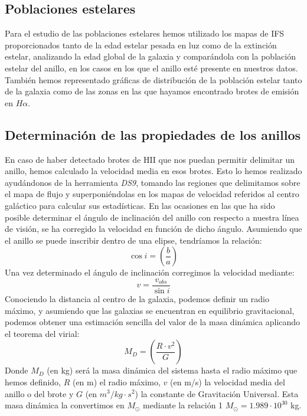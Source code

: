 \documentclass{article}
\newcommand{\hal}{$H\alpha$}
\begin{document}
\subsection{Poblaciones estelares}
Para el estudio de las poblaciones estelares hemos utilizado los mapas de IFS proporcionados tanto de la edad estelar pesada en luz como de la extinción estelar, analizando la edad global de la galaxia y comparándola con la población estelar del anillo, en los casos en los que el anillo esté presente en nuestros datos. También hemos representado gráficas de distribución de la población estelar tanto de la galaxia como de las zonas en las que hayamos encontrado brotes de emisión en \hal. 
\subsection{Determinación de las propiedades de los anillos}
En caso de haber detectado brotes de HII que nos puedan permitir delimitar un anillo, hemos calculado la velocidad media en esos brotes. Esto lo hemos realizado ayudándonos de la herramienta \emph{DS9}, tomando las regiones que delimitamos sobre el mapa de flujo y superponiéndolas en los mapas de velocidad referidos al centro galáctico para calcular sus estadísticas. 
En las ocasiones en las que ha sido posible determinar el ángulo de inclinación del anillo con respecto a nuestra línea de visión, se ha corregido la velocidad en función de dicho ángulo. Asumiendo que el anillo se puede inscribir dentro de una elipse, tendríamos la relación:
\begin{equation}
\cos i=\left(\frac{b}{a}\right) \label{ecuacion_2}
\end{equation}
Una vez determinado el ángulo de inclinación corregimos la velocidad mediante:
\begin{equation}
v=\frac{v_{obs}}{\sin i} \label{ecuacion_3}
\end{equation}
Conociendo la distancia al centro de la galaxia, podemos definir un radio máximo, y asumiendo que las galaxias se encuentran en equilibrio gravitacional, podemos obtener una estimación sencilla del valor de la masa dinámica aplicando el teorema del virial:
\begin{equation}
M_{D}=\left(\frac{R\cdot v^{2}}{G}\right) \label{ecuacion_4}
\end{equation}
Donde $M_{D}$ (en kg) será la masa dinámica del sistema hasta el radio máximo que hemos definido, $R$ (en m) el radio máximo, $v$ (en m/s) la velocidad media del anillo o del brote y $G$ (en $m^{3}/kg\cdot s^{2}$) la constante de Gravitación Universal. Esta masa dinámica la convertimos en $M_{\odot}$ mediante la relación 1 $M_{\odot} = 1.989\cdot 10^{30}$ kg.
\end{document}
